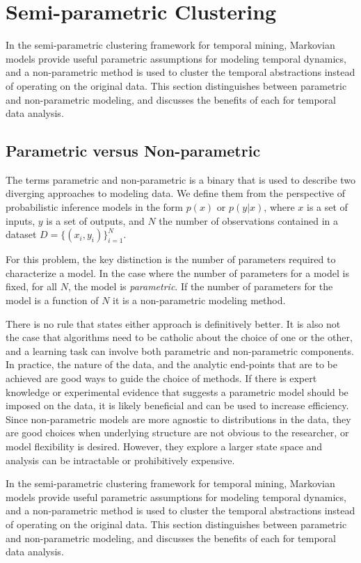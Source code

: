 \section{Semi-parametric Clustering}
In the semi-parametric clustering framework for temporal mining, Markovian models provide useful parametric assumptions for modeling
temporal dynamics, and a non-parametric method is used to cluster the temporal abstractions instead of operating on the original data.  This section distinguishes between parametric and non-parametric modeling, and discusses the benefits of each for temporal data analysis.

\subsection{Parametric versus Non-parametric}
The terms parametric and non-parametric is a binary that is used to describe two diverging approaches to modeling data.  We define them from the perspective of probabilistic inference models in the form $p(x)$ or $p(y|x)$, where $x$ is a set of inputs, $y$ is a set of outputs, and $N$ the number of observations contained in a dataset $D=\{(x_i,y_i)\}_{i=1}^{N}$.

For this problem, the key distinction is the number of parameters required to characterize a model.   In the case where the number of parameters for a model is fixed, for all $N$, the model is \emph{parametric}.  If the number of parameters for the model is a function of $N$ it is a non-parametric modeling method.

There is no rule that states either approach is definitively better.  It is also not the case that algorithms need to be catholic about the choice of one or the other, and a learning task can involve both parametric and non-parametric components.     In practice, the nature of the data, and the analytic end-points that are to be achieved are good ways to guide the choice of methods.  If there is expert knowledge or experimental evidence that suggests a parametric model should be imposed on the data, it is likely beneficial and can be used to increase efficiency.  Since non-parametric models are more agnostic to distributions in the data, they are good choices when underlying structure are not obvious to the researcher, or model flexibility is desired.  However, they explore a larger state space and analysis can be intractable or prohibitively expensive.

In the semi-parametric clustering framework for temporal mining, Markovian models provide useful parametric assumptions for modeling
temporal dynamics, and a non-parametric method is used to cluster the temporal abstractions instead of operating on the original data.  This section distinguishes between parametric and non-parametric modeling, and discusses the benefits of each for temporal data analysis.
